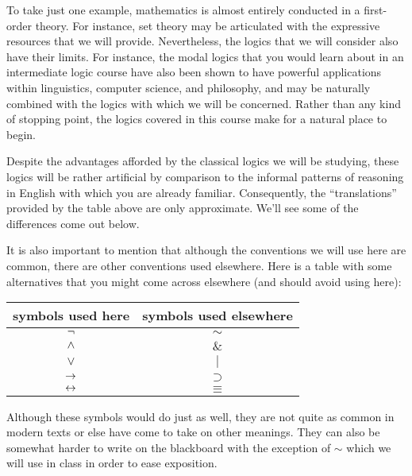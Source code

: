 To take just one example, mathematics is almost entirely conducted in a first-order theory.
For instance, set theory may be articulated with the expressive resources that we will provide.
Nevertheless, the logics that we will consider also have their limits.
For instance, the modal logics that you would learn about in an intermediate logic course have also been shown to have powerful applications within linguistics, computer science, and philosophy, and may be naturally combined with the logics with which we will be concerned.
Rather than any kind of stopping point, the logics covered in this course make for a natural place to begin.

Despite the advantages afforded by the classical logics we will be studying, these logics will be rather artificial by comparison to the informal patterns of reasoning in English with which you are already familiar.
Consequently, the ``translations'' provided by the table above are only approximate.
We'll see some of the differences come out below.

It is also important to mention that although the conventions we will use here are common, there are other conventions used elsewhere.
Here is a table with some alternatives that you might come across elsewhere (and should avoid using here):

\begin{table}[h]
\center
\begin{tabular}{|c|c|}
\hline
symbols used here & symbols used elsewhere \\
\hline
  $\neg$ & $\sim$ \\
  $\wedge$ & $\&$ \\
  $\vee$  & $\mid$ \\
  $\rightarrow$  & $\supset$ \\
  $\leftrightarrow$ & $\equiv$ \\
\hline
\end{tabular}
\end{table}

Although these symbols would do just as well, they are not quite as common in modern texts or else have come to take on other meanings.
They can also be somewhat harder to write on the blackboard with the exception of $\sim$ which we will use in class in order to ease exposition. 

